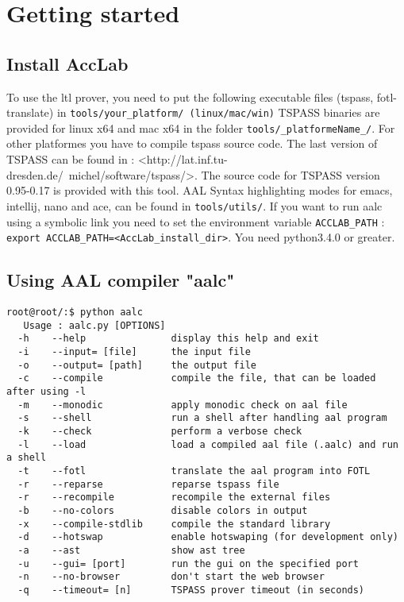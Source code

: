 \section{Getting started}

\subsection{Install AccLab}
To use the ltl prover, you need to put the following executable files (tspass, fotl-translate) in
\texttt{tools/your\_platform/ (linux/mac/win)}
TSPASS binaries are provided for linux x64 and mac x64 in the folder \texttt{tools/\_platformeName\_/}.
For other platformes you have to compile tspass source code.
The last version of TSPASS can be found in :
{\small{<http://lat.inf.tu-dresden.de/~michel/software/tspass/>}}. The source code for TSPASS version 0.95-0.17
is provided with this tool.
AAL Syntax highlighting modes for emacs, intellij, nano and ace, can be found in \texttt{tools/utils/}.
If you want to run aalc using a symbolic link you need to set the environment variable \texttt{ACCLAB\_PATH} :
\texttt{export ACCLAB\_PATH=<AccLab\_install\_dir>}. You need python3.4.0 or greater.


\subsection{Using AAL compiler "aalc"}
{\lstset{style=shell}
\begin{lstlisting}[caption={aalc options}]
root@root/:$ python aalc
   Usage : aalc.py [OPTIONS]
  -h 	--help          	 display this help and exit
  -i 	--input= [file] 	 the input file
  -o 	--output= [path]	 the output file
  -c 	--compile       	 compile the file, that can be loaded after using -l
  -m 	--monodic       	 apply monodic check on aal file
  -s 	--shell         	 run a shell after handling aal program
  -k 	--check         	 perform a verbose check
  -l 	--load          	 load a compiled aal file (.aalc) and run a shell
  -t 	--fotl          	 translate the aal program into FOTL
  -r 	--reparse       	 reparse tspass file
  -r 	--recompile     	 recompile the external files
  -b 	--no-colors     	 disable colors in output
  -x 	--compile-stdlib	 compile the standard library
  -d 	--hotswap       	 enable hotswaping (for development only)
  -a 	--ast           	 show ast tree
  -u 	--gui= [port]   	 run the gui on the specified port
  -n 	--no-browser    	 don't start the web browser
  -q 	--timeout= [n]  	 TSPASS prover timeout (in seconds)

\end{lstlisting}
}

